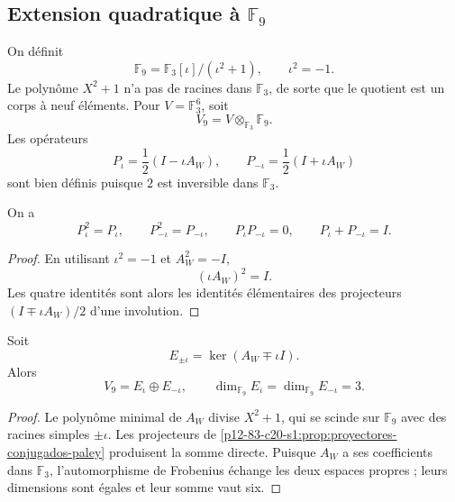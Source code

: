 \subsection{Extension quadratique à \texorpdfstring{\(\mathbb F_9\)}{F₉}}

On définit
\begin{equation}
 \mathbb F_9=\mathbb F_3[\iota]/(\iota^2+1),
 \qquad \iota^2=-1.
 \label{p12-83-c20-s1:eq:definicion-f9-autonoma}
\end{equation}
Le polynôme \(X^2+1\) n'a pas de racines dans \(\mathbb F_3\), de sorte que le
quotient est un corps à neuf éléments. Pour
\(V=\mathbb F_3^6\), soit
\[
 V_9=V\otimes_{\mathbb F_3}\mathbb F_9.
\]
Les opérateurs
\begin{equation}
 P_\iota=\frac12(I-\iota A_W),
 \qquad
 P_{-\iota}=\frac12(I+\iota A_W)
 \label{p12-83-c20-s1:eq:proyectores-f9-paley}
\end{equation}
sont bien définis puisque \(2\) est inversible dans \(\mathbb F_3\).

\begin{proposition}
\label{p12-83-c20-s1:prop:proyectores-conjugados-paley}
On a
\[
 P_\iota^2=P_\iota,
 \qquad
 P_{-\iota}^2=P_{-\iota},
 \qquad
 P_\iota P_{-\iota}=0,
 \qquad
 P_\iota+P_{-\iota}=I.
\]
\end{proposition}

\begin{proof}
En utilisant \(\iota^2=-1\) et \(A_W^2=-I\),
\[
 (\iota A_W)^2=I.
\]
Les quatre identités sont alors les identités élémentaires des
projecteurs \((I\mp\iota A_W)/2\) d'une involution.
\end{proof}

\begin{theorem}
\label{p12-83-c20-s1:thm:descomposicion-espectral-f9-paley}
Soit
\[
 E_{\pm\iota}=\ker(A_W\mp\iota I).
\]
Alors
\begin{equation}
 V_9=E_\iota\oplus E_{-\iota},
 \qquad
 \dim_{\mathbb F_9}E_\iota
 =\dim_{\mathbb F_9}E_{-\iota}=3.
 \label{p12-83-c20-s1:eq:descomposicion-espectral-f9-paley}
\end{equation}
\end{theorem}

\begin{proof}
Le polynôme minimal de \(A_W\) divise \(X^2+1\), qui se scinde sur
\(\mathbb F_9\) avec des racines simples \(\pm\iota\). Les projecteurs de
\cref{p12-83-c20-s1:prop:proyectores-conjugados-paley} produisent la somme directe. Puisque
\(A_W\) a ses coefficients dans \(\mathbb F_3\), l'automorphisme de
Frobenius échange les deux espaces propres ; leurs dimensions sont égales et
leur somme vaut six.
\end{proof}

